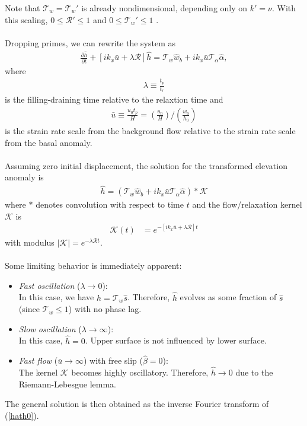 \documentclass[paper=a4, fontsize=11pt]{article}
\begin{document}
Note that $\mathcal{T}_w=\mathcal{T}_w'$ is already nondimensional, depending only on $k' = \nu$.
With this scaling, $0\leq \mathcal{R}' \leq 1$ and $0\leq \mathcal{T}_w' \leq 1$  . \\ \\
Dropping primes, we can rewrite the system as
\begin{align}
\frac{\partial \widehat{h}}{\partial t} +\left[ik_x \bar{u} + \lambda\mathcal{R} \right]\widehat{h} = \mathcal{T}_w\widehat{w}_b +i k_x \bar{u} \mathcal{T}_{\alpha}\widehat{\alpha}, \label{dhhatsc}
\end{align}
where
\begin{align}
  \lambda \equiv  \frac{t_p}{t_r}
\end{align}
is the filling-draining time relative to the relaxtion time and
\begin{align}
\bar{u} \equiv \frac{u_0 t_p}{H} = \left(\frac{u_0}{H}\right) / \left(\frac{w_0}{h_0}\right)
\end{align}
is the strain rate scale from the background flow relative to the strain rate scale from the basal anomaly.
\\ \\
Assuming zero initial displacement, the solution for the transformed elevation anomaly is
\begin{align}
\widehat{h} = (\mathcal{T}_w\widehat{w}_b + ik_x\bar{u}\mathcal{T}_{\alpha}\widehat{\alpha}  )* \mathcal{K} \label{hath0}
\end{align}
where $*$ denotes convolution with respect to time $t$ and
the flow/relaxation kernel $\mathcal{K}$ is
\begin{align}
\mathcal{K}(t) &= e^{-[ik_x\bar{u}+\lambda \mathcal{R}]t}
\end{align}
with modulus $|\mathcal{K}| = e^{-\lambda\mathcal{R}t}$.
\\ \\
Some limiting behavior is immediately apparent:
\begin{itemize}
\item \emph{Fast oscillation} ($\lambda \to 0$):  \\ In this case, we have
$\widehat{h} = \mathcal{T}_w\widehat{s} $.
Therefore, $\widehat{h}$ evolves as some fraction of $\widehat{s}$ (since $\mathcal{T}_w\leq 1$) with no phase lag.
\item \emph{Slow oscillation} ($\lambda\to \infty$): \\
In this case, $\widehat{h}=0$. Upper surface is not influenced by lower surface.
\item \emph{Fast flow} ($\bar{u}\to\infty$) with free slip ($\widehat{\beta}=0$): \\ The kernel
$\mathcal{K}$ becomes highly oscillatory. Therefore, $\widehat{h}\to 0$ due to the Riemann-Lebesgue lemma.
\end{itemize}
The general solution is then obtained as the inverse Fourier transform of (\ref{hath0}).
\end{document}
